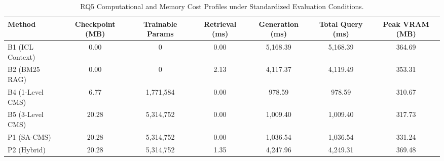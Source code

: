 \begin{table}[t]
\centering
\small
\caption{RQ5 Computational and Memory Cost Profiles under Standardized Evaluation Conditions.}
\label{tab:rq5_cost}
\begin{tabular}{lcccccc}
\toprule
\textbf{Method} & \textbf{Checkpoint (MB)} & \textbf{Trainable Params} & \textbf{Retrieval (ms)} & \textbf{Generation (ms)} & \textbf{Total Query (ms)} & \textbf{Peak VRAM (MB)} \\
\midrule
B1 (ICL Context) & 0.00  & 0         & 0.00 & 5,168.39 & 5,168.39 & 364.69 \\
B2 (BM25 RAG)    & 0.00  & 0         & 2.13 & 4,117.37 & 4,119.49 & 353.31 \\
B4 (1-Level CMS) & 6.77  & 1,771,584 & 0.00 & 978.59   & 978.59   & 310.67 \\
B5 (3-Level CMS) & 20.28 & 5,314,752 & 0.00 & 1,009.40 & 1,009.40 & 317.73 \\
P1 (SA-CMS)      & 20.28 & 5,314,752 & 0.00 & 1,036.54 & 1,036.54 & 331.24 \\
P2 (Hybrid)      & 20.28 & 5,314,752 & 1.35 & 4,247.96 & 4,249.31 & 369.48 \\
\bottomrule
\end{tabular}
\end{table}
